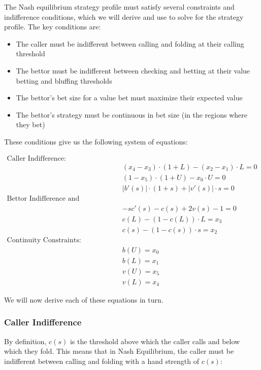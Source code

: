 \documentclass[a4paper,12pt]{article}
\theoremstyle{plain}
\theoremstyle{definition}
\begin{document}
The Nash equilibrium strategy profile must satisfy several constraints and indifference conditions, which we will derive and use to solve for the strategy profile. The key conditions are:

\begin{itemize}
    \item The caller must be indifferent between calling and folding at their calling threshold
    \item The bettor must be indifferent between checking and betting at their value betting and bluffing thresholds
    \item The bettor's bet size for a value bet must maximize their expected value
    \item The bettor's strategy must be continuous in bet size (in the regions where they bet)
\end{itemize}

These conditions give us the following system of equations:

\begin{align*}
    \text{Caller Indifference:} & \\
    & (x_4-x_3) \cdot (1+L) - (x_2-x_1) \cdot L = 0\\
    & (1-x_5) \cdot (1+U) - x_0 \cdot U = 0\\
    & |b'(s)| \cdot (1 + s) + |v'(s)| \cdot s = 0\\
    \text{Bettor Indifference and Optimality:} & \\
    & -sc'(s) - c(s) + 2 v(s) - 1 = 0\\
    & c(L) - (1-c(L)) \cdot L = x_3\\
    & c(s) - (1-c(s)) \cdot s = x_2\\
    \text{Continuity Constraints:} & \\
    & b(U) = x_0 \\
    & b(L) = x_1 \\
    & v(U) = x_5 \\
    & v(L) = x_4
\end{align*}

We will now derive each of these equations in turn.

\subsubsection{Caller Indifference}
\label{subsec:caller_indifference}

By definition, $c(s)$ is the threshold above which the caller calls and below which they fold. This means that in Nash Equilibrium, the caller must be indifferent between calling and folding with a hand strength of $c(s)$:
\end{document}
